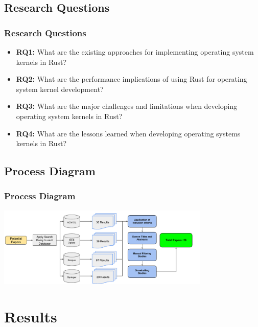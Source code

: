 \documentclass{beamer}
\begin{document}
\subsection{Research Questions}
\begin{frame}
  \frametitle{Research Questions}
  \begin{itemize}
  \item<1-> \textbf{RQ1:} What are the existing approaches for implementing operating system kernels in Rust?
  \item<2-> \textbf{RQ2:} What are the performance implications of using Rust for operating system kernel development?
  \item<3-> \textbf{RQ3:} What are the major challenges and limitations when developing operating system kernels in Rust?
  \item<4-> \textbf{RQ4:} What are the lessons learned when developing operating systems kernels in Rust?

  \end{itemize}
\end{frame}

\subsection{Process Diagram}
\begin{frame}
  \frametitle{Process Diagram}
  \includegraphics[width=4in]{figures/process-diagram.pdf}
\end{frame}
\section{Results}
\end{document}
